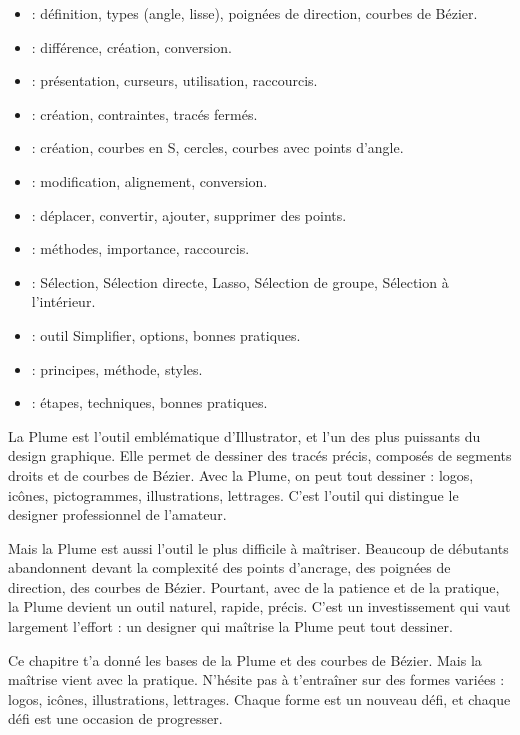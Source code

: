 \begin{itemize}
    \item {} : définition, types (angle, lisse), poignées de direction, courbes de Bézier.
    \item {} : différence, création, conversion.
    \item {} : présentation, curseurs, utilisation, raccourcis.
    \item {} : création, contraintes, tracés fermés.
    \item {} : création, courbes en S, cercles, courbes avec points d'angle.
    \item {} : modification, alignement, conversion.
    \item {} : déplacer, convertir, ajouter, supprimer des points.
    \item {} : méthodes, importance, raccourcis.
    \item {} : Sélection, Sélection directe, Lasso, Sélection de groupe, Sélection à l'intérieur.
    \item {} : outil Simplifier, options, bonnes pratiques.
    \item {} : principes, méthode, styles.
    \item {} : étapes, techniques, bonnes pratiques.
\end{itemize}

La Plume est l'outil emblématique d'Illustrator, et l'un des plus puissants du design graphique. Elle permet de dessiner des tracés précis, composés de segments droits et de courbes de Bézier. Avec la Plume, on peut tout dessiner : logos, icônes, pictogrammes, illustrations, lettrages. C'est l'outil qui distingue le designer professionnel de l'amateur.

Mais la Plume est aussi l'outil le plus difficile à maîtriser. Beaucoup de débutants abandonnent devant la complexité des points d'ancrage, des poignées de direction, des courbes de Bézier. Pourtant, avec de la patience et de la pratique, la Plume devient un outil naturel, rapide, précis. C'est un investissement qui vaut largement l'effort : un designer qui maîtrise la Plume peut tout dessiner.

Ce chapitre t'a donné les bases de la Plume et des courbes de Bézier. Mais la maîtrise vient avec la pratique. N'hésite pas à t'entraîner sur des formes variées : logos, icônes, illustrations, lettrages. Chaque forme est un nouveau défi, et chaque défi est une occasion de progresser.

